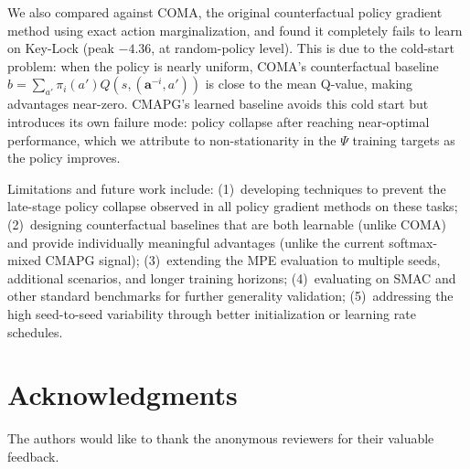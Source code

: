 \documentclass[journal]{IEEEtran}
\begin{document}
We also compared against COMA, the original counterfactual policy gradient method using exact action marginalization, and found it completely fails to learn on Key-Lock (peak $-4.36$, at random-policy level). This is due to the cold-start problem: when the policy is nearly uniform, COMA's counterfactual baseline $b = \sum_{a'} \pi_i(a') Q(s, (\mathbf{a}^{-i}, a'))$ is close to the mean Q-value, making advantages near-zero. CMAPG's learned baseline avoids this cold start but introduces its own failure mode: policy collapse after reaching near-optimal performance, which we attribute to non-stationarity in the $\Psi$ training targets as the policy improves.

Limitations and future work include: (1)~developing techniques to prevent the late-stage policy collapse observed in all policy gradient methods on these tasks; (2)~designing counterfactual baselines that are both learnable (unlike COMA) and provide individually meaningful advantages (unlike the current softmax-mixed CMAPG signal); (3)~extending the MPE evaluation to multiple seeds, additional scenarios, and longer training horizons; (4)~evaluating on SMAC and other standard benchmarks for further generality validation; (5)~addressing the high seed-to-seed variability through better initialization or learning rate schedules.

\section*{Acknowledgments}
The authors would like to thank the anonymous reviewers for their valuable feedback.
\end{document}
